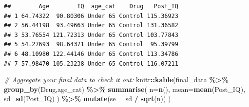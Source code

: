 \documentclass[
]{book}
\newenvironment{Shaded}{\begin{snugshade}}{\end{snugshade}}
\newcommand{\AttributeTok}[1]{\textcolor[rgb]{0.13,0.29,0.53}{#1}}
\newcommand{\CommentTok}[1]{\textcolor[rgb]{0.56,0.35,0.01}{\textit{#1}}}
\newcommand{\DecValTok}[1]{\textcolor[rgb]{0.00,0.00,0.81}{#1}}
\newcommand{\FunctionTok}[1]{\textcolor[rgb]{0.13,0.29,0.53}{\textbf{#1}}}
\newcommand{\NormalTok}[1]{#1}
\newcommand{\OtherTok}[1]{\textcolor[rgb]{0.56,0.35,0.01}{#1}}
\newcommand{\SpecialCharTok}[1]{\textcolor[rgb]{0.81,0.36,0.00}{\textbf{#1}}}
\begin{document}
\begin{Shaded}
\end{Shaded}

\begin{verbatim}
##        Age        IQ  age_cat    Drug   Post_IQ
## 1 64.74322  90.80306 Under 65 Control 115.36923
## 2 56.44198  93.49663 Under 65 Control 131.36582
## 3 53.76554 121.72313 Under 65 Control 103.77843
## 5 54.27693  98.64371 Under 65 Control  95.39799
## 6 48.10980 122.44146 Under 65 Control 113.34786
## 7 57.98470 105.23238 Under 65 Control 116.07211
\end{verbatim}

\begin{Shaded}
\begin{Highlighting}[]
\CommentTok{\# Aggregate your final data to check it out: }
\NormalTok{knitr}\SpecialCharTok{::}\FunctionTok{kable}\NormalTok{(final\_data }\SpecialCharTok{\%\textgreater{}\%}
  \FunctionTok{group\_by}\NormalTok{(Drug,age\_cat) }\SpecialCharTok{\%\textgreater{}\%}
  \FunctionTok{summarise}\NormalTok{(}
    \AttributeTok{n=}\FunctionTok{n}\NormalTok{(),}
    \AttributeTok{mean=}\FunctionTok{mean}\NormalTok{(Post\_IQ),}
    \AttributeTok{sd=}\FunctionTok{sd}\NormalTok{(Post\_IQ)}
\NormalTok{  ) }\SpecialCharTok{\%\textgreater{}\%} \FunctionTok{mutate}\NormalTok{(}\AttributeTok{se =}\NormalTok{ sd }\SpecialCharTok{/} \FunctionTok{sqrt}\NormalTok{(n))}
\NormalTok{)}
\end{Highlighting}
\end{Shaded}
\end{document}
